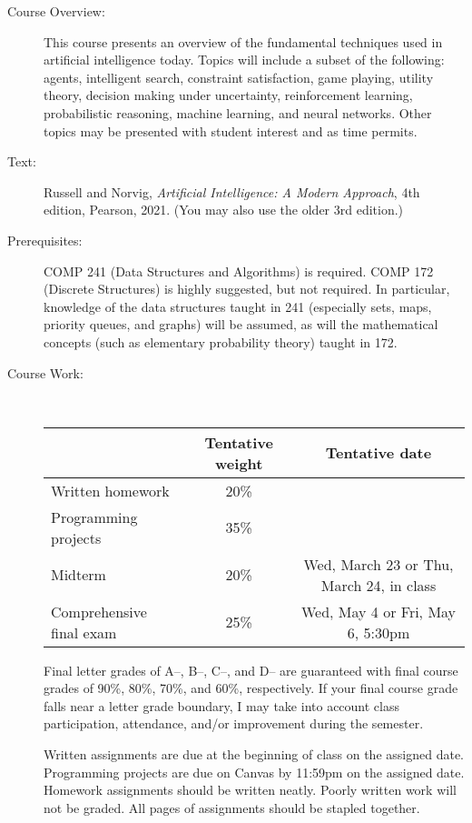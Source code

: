 \documentclass [letterpaper,11pt]{article}
\begin{document}
\begin{description}
\item[Course Overview:] This course presents an overview of the fundamental techniques
used in artificial intelligence today.  Topics will include a subset of the following:
agents, intelligent search, constraint satisfaction, game playing, utility theory, decision making under uncertainty, reinforcement learning, probabilistic reasoning, machine learning,
and neural networks.
Other topics may be presented with student interest and as time permits.

\item[Text:] Russell and Norvig, \textit{Artificial Intelligence: A Modern Approach}, 
4th edition, Pearson, 2021.   (You may also use the older 3rd edition.)

\item[Prerequisites:] COMP 241 (Data Structures and Algorithms) is required.  COMP 172 (Discrete Structures) is highly suggested, but not required.
In particular, knowledge of the data structures taught in 241 (especially sets, maps, priority queues, and graphs) will be assumed, as will the 
mathematical concepts (such as elementary probability theory) taught in 172.

\item[Course Work:] \

\begin{tabular}{lcc} 
& Tentative weight & Tentative date \\ \hline
Written homework & 20\% & \\
Programming projects & 35\% & \\
Midterm & 20\% & Wed, March 23 or Thu, March 24, in class\\
Comprehensive final exam & 25\% & Wed, May 4 or Fri, May 6, 5:30pm\\
\end{tabular}

Final letter grades of A--, B--, C--, and D-- are guaranteed with final course grades of 90\%, 80\%,
70\%, and 60\%, respectively.
If your final course grade falls near a letter grade boundary,
I may take into account class participation, attendance, and/or improvement during the semester.

Written assignments are due at the beginning of class on the assigned date. Programming
projects are due on Canvas by 11:59pm on the assigned date.  Homework assignments should be
written neatly. Poorly written work will not be graded. All pages of assignments should be
stapled together.


\end{description}
\end{document}
